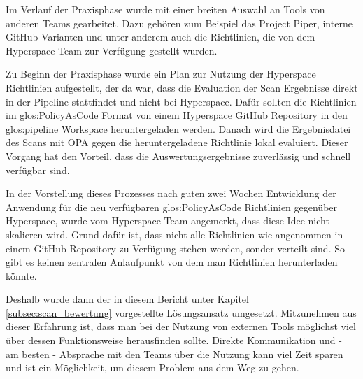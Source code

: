 \documentclass[../main.tex]{subfiles}
\begin{document}
Im Verlauf der Praxisphase wurde mit einer breiten Auswahl an Tools von anderen Teams gearbeitet.
Dazu gehören zum Beispiel das Project Piper, interne GitHub Varianten und unter anderem auch die Richtlinien, die von dem Hyperspace Team zur Verfügung gestellt wurden.

Zu Beginn der Praxisphase wurde ein Plan zur Nutzung der Hyperspace Richtlinien aufgestellt, der da war, dass die Evaluation der Scan Ergebnisse direkt in der Pipeline stattfindet und nicht bei Hyperspace.
Dafür sollten die Richtlinien im \gls{glos:PolicyAsCode} Format von einem Hyperspace GitHub Repository in den \gls{glos:pipeline} Workspace heruntergeladen werden.
Danach wird die Ergebnisdatei des Scans mit \gls{OPA} gegen die heruntergeladene Richtlinie lokal evaluiert.
Dieser Vorgang hat den Vorteil, dass die Auswertungsergebnisse zuverlässig und schnell verfügbar sind.

In der Vorstellung dieses Prozesses nach guten zwei Wochen Entwicklung der Anwendung für die neu verfügbaren \gls{glos:PolicyAsCode} Richtlinien gegenüber Hyperspace, wurde vom Hyperspace Team angemerkt, dass diese Idee nicht skalieren wird.
Grund dafür ist, dass nicht alle Richtlinien wie angenommen in einem GitHub Repository zu Verfügung stehen werden, sonder verteilt sind.
So gibt es keinen zentralen Anlaufpunkt von dem man Richtlinien herunterladen könnte.

Deshalb wurde dann der in diesem Bericht unter Kapitel \ref{subsec:scan_bewertung} vorgestellte Lösungsansatz umgesetzt.
Mitzunehmen aus dieser Erfahrung ist, dass man bei der Nutzung von externen Tools möglichst viel über dessen Funktionsweise herausfinden sollte.
Direkte Kommunikation und - am besten - Absprache mit den Teams über die Nutzung kann viel Zeit sparen und ist ein Möglichkeit, um diesem Problem aus dem Weg zu gehen.
\end{document}
